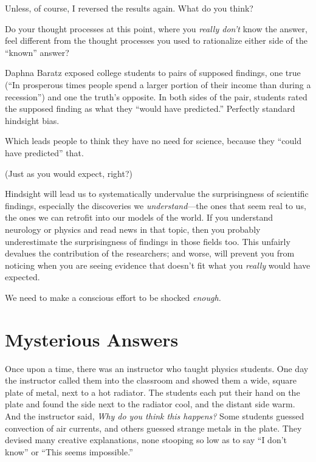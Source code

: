 {
 Unless, of course, I reversed the results again. What do you
think?}

{
 Do your thought processes at this point, where you \textit{really
don't} know the answer, feel different from the thought
processes you used to rationalize either side of the
``known'' answer?}

{
 Daphna Baratz exposed college students to pairs of supposed
findings, one true (``In prosperous times people spend
a larger portion of their income than during a
recession'') and one the truth's
opposite. In both sides of the pair, students rated
the supposed finding as what they ``would have
predicted.'' Perfectly standard hindsight bias.}

{
 Which leads people to think they have no need for science, because
they ``could have predicted'' that.}

{
 (Just as you would expect, right?)}

{
 Hindsight will lead us to systematically undervalue the
surprisingness of scientific findings, especially the discoveries we
\textit{understand}{}---the ones that seem real to us, the ones we can
retrofit into our models of the world. If you understand neurology or
physics and read news in that topic, then you probably underestimate
the surprisingness of findings in those fields too. This unfairly
devalues the contribution of the researchers; and worse, will prevent
you from noticing when you are seeing evidence that
doesn't fit what you \textit{really} would have
expected.}

{
 We need to make a conscious effort to be shocked \textit{enough.}}

\myendsectiontext


\bigskip

\chapter{Mysterious Answers}


{
 Once upon a time, there was an instructor who taught physics
students. One day the instructor called them into the classroom and
showed them a wide, square plate of metal, next to a hot radiator. The
students each put their hand on the plate and found the side next to
the radiator cool, and the distant side warm. And the instructor said,
\textit{Why do you think this happens?} Some students guessed
convection of air currents, and others guessed strange metals in the
plate. They devised many creative explanations, none stooping so low as
to say ``I don't
know'' or ``This seems
impossible.'' }

